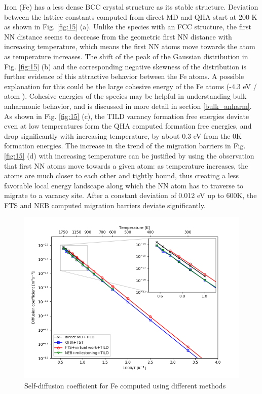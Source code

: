 \documentclass{article}
\begin{document}
Iron (Fe) has a less dense BCC crystal structure as its stable structure. Deviation between the lattice constants computed from direct MD and QHA start at 200 K as shown in Fig. \ref{fig:15} (a). Unlike the species with an FCC structure, the first NN distance seems to decrease from the geometric first NN distance with increasing temperature, which means the first NN atoms move towards the atom as temperature increases. The shift of the peak of the Gaussian distribution in Fig. \ref{fig:15} (b) and the corresponding negative skewness of the distribution is further evidence of this attractive behavior between the Fe atoms. A possible explanation for this could be the large cohesive energy of the Fe atoms (-4.3 eV / atom \cite{Ackland1997}). Cohesive energies of the species may be helpful in understanding bulk anharmonic behavior, and is discussed in more detail in section \ref{bulk_anharm}. As shown in Fig. \ref{fig:15} (c), the TILD vacancy formation free energies deviate even at low temperatures form the QHA computed formation free energies, and drop significantly with increasing temperature, by about 0.3 eV from the 0K formation energies. The increase in the trend of the migration barriers  in Fig. \ref{fig:15} (d) with increasing temperature can be justified by using the observation that first NN atoms move towards a given atom: as temperature increases, the atoms are much closer to each other and tightly bound, thus creating a less favorable local energy landscape along which the NN atom has to traverse to migrate to a vacancy site. After a constant deviation of 0.012 eV up to 600K, the FTS and NEB computed migration barriers deviate significantly.

\begin{figure}[htp]
\centering
\includegraphics[scale=0.65]{fe_self_diffusion}
\caption{Self-diffusion coefficient for Fe computed using different methods}
\label{fig:16}
\end{figure}
\end{document}
